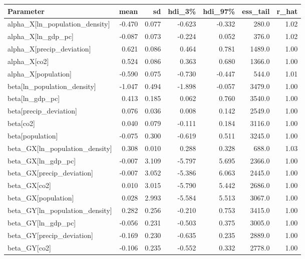 \begin{table}[H]
\centering
{}
\label{tab:damage_results}
\footnotesize
\begin{tabular}{lrrrrrr}
\toprule
\textbf{Parameter} & \textbf{mean} & \textbf{sd} & \textbf{hdi\_3\%} & \textbf{hdi\_97\%} & \textbf{ess\_tail} & \textbf{r\_hat} \\
\midrule
alpha\_X[ln\_population\_density] & -0.470 & 0.077 & -0.623 & -0.332 & 280.0 & 1.02 \\
alpha\_X[ln\_gdp\_pc] & -0.087 & 0.073 & -0.224 & 0.052 & 376.0 & 1.02 \\
alpha\_X[precip\_deviation] & 0.621 & 0.086 & 0.464 & 0.781 & 1489.0 & 1.00 \\
alpha\_X[co2] & 0.524 & 0.086 & 0.363 & 0.680 & 1366.0 & 1.00 \\
alpha\_X[population] & -0.590 & 0.075 & -0.730 & -0.447 & 544.0 & 1.01 \\
beta[ln\_population\_density] & -1.047 & 0.494 & -1.898 & -0.057 & 3479.0 & 1.00 \\
beta[ln\_gdp\_pc] & 0.413 & 0.185 & 0.062 & 0.760 & 3540.0 & 1.00 \\
beta[precip\_deviation] & 0.076 & 0.036 & 0.008 & 0.142 & 2549.0 & 1.00 \\
beta[co2] & 0.040 & 0.079 & -0.111 & 0.184 & 3116.0 & 1.00 \\
beta[population] & -0.075 & 0.300 & -0.619 & 0.511 & 3245.0 & 1.00 \\
beta\_GX[ln\_population\_density] & 0.308 & 0.010 & 0.288 & 0.328 & 688.0 & 1.03 \\
beta\_GX[ln\_gdp\_pc] & -0.007 & 3.109 & -5.797 & 5.695 & 2366.0 & 1.00 \\
beta\_GX[precip\_deviation] & -0.007 & 3.052 & -5.386 & 6.063 & 2445.0 & 1.00 \\
beta\_GX[co2] & 0.010 & 3.015 & -5.790 & 5.442 & 2686.0 & 1.00 \\
beta\_GX[population] & 0.028 & 2.993 & -5.584 & 5.513 & 3067.0 & 1.00 \\
beta\_GY[ln\_population\_density] & 0.282 & 0.256 & -0.210 & 0.753 & 3415.0 & 1.00 \\
beta\_GY[ln\_gdp\_pc] & -0.056 & 0.231 & -0.503 & 0.375 & 3005.0 & 1.00 \\
beta\_GY[precip\_deviation] & -0.169 & 0.230 & -0.635 & 0.235 & 2889.0 & 1.00 \\
beta\_GY[co2] & -0.106 & 0.235 & -0.552 & 0.332 & 2778.0 & 1.00 \\

\end{tabular}
\end{table}

